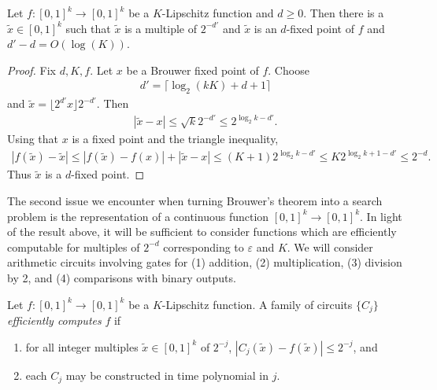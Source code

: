 \documentclass{article}
\begin{document}
\begin{lemma}
  Let $f:\left[{0,1}\right]^k\to\left[{0,1}\right]^k$ be a
  $K$-Lipschitz function and $d\geq 0$. Then there is a $\tilde x \in [0,1]^k$ such that $\tilde x$ is a multiple of $2^{-d'}$ and $\tilde x$
  is an $d$-fixed point of $f$ and $d'-d=O(\log(K))$.
  \begin{proof}
    Fix $d,K,f$. Let $x$ be a Brouwer fixed point of $f$.
    Choose
    \begin{align}\label{eq:d}
      d' = \lceil \log_2\left({kK}\right) + d + 1\rceil
    \end{align}
    and $\tilde x = \lfloor{2^{d'} x}\rfloor2^{-d'}$.
    Then
    \begin{align*}
      |\tilde x - x| \leq \sqrt{k} 2^{-d'} \leq 2^{\log_2 k-d'}.
    \end{align*}
    Using that $x$ is a fixed point and the triangle inequality,
    \begin{align*}
      |f(\tilde x)-\tilde x| \leq |f(\tilde x)-f(x)|+|\tilde x - x|
      \leq (K+1)2^{\log_2 k-d'} \leq K2^{\log_2 k+1-d'}\leq 2^{-d}.
    \end{align*}
    Thus $\tilde x$ is a $d$-fixed point.
  \end{proof}
\end{lemma}

The second issue we encounter when turning Brouwer's theorem into
a search problem is the representation of a continuous function
$\left[{0,1}\right]^k\to\left[{0,1}\right]^k$. In light of the result
above, it will be sufficient to consider functions which are
efficiently computable for multiples of $2^{-d}$ corresponding
to $\varepsilon$ and $K$. We will consider arithmetic circuits
involving gates for (1) addition, (2) multiplication, (3) division by 2,
and (4) comparisons with binary outputs.

\begin{definition}
  Let $f:\left[{0,1}\right]^k\to\left[{0,1}\right]^k$ be a
  $K$-Lipschitz function. A family of circuits $\{C_j\}$ \emph{efficiently computes} $f$ if
  \begin{enumerate}

    \item for all integer multiples $\tilde x\in\left[{0,1}\right]^k$ of $2^{-j}$, $|C_j(\tilde x) - f(\tilde x)|\leq 2^{-j}$, and
    \item each $C_j$ may be constructed in time polynomial in $j$.
  \end{enumerate}
\end{definition}
\end{document}
